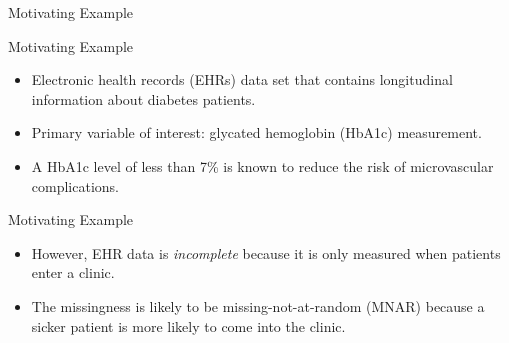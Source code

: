 \documentclass{beamer} %
\begin{document}
\begin{frame}

  \begin{center}
    \Large
    Motivating Example
  \end{center}

\end{frame}

\begin{frame}{Motivating Example}
  \begin{itemize}
    \item Electronic health records (EHRs) data set that contains longitudinal
      information about diabetes patients.
    \item Primary variable of interest: glycated hemoglobin (HbA1c) measurement.
    \item A HbA1c level of less than 7\% is known to reduce the risk of
      microvascular complications.
  \end{itemize}
\end{frame}

\begin{frame}{Motivating Example}
  \begin{itemize}
    \item However, EHR data is \textit{incomplete} because it is only measured
      when patients enter a clinic.
    \item The missingness is likely to be missing-not-at-random (MNAR) because
      a sicker patient is more likely to come into the clinic. 
  \end{itemize}
\end{frame}
\end{document}
